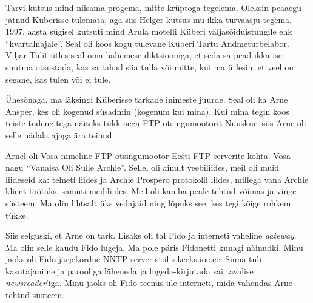 Tarvi kutsus mind niisama progema, mitte krüptoga tegelema. Oleksin peaaegu jätnud
Küberisse tulemata, aga siis Helger kutsus mu ikka turvaasju tegema. 1997. aasta sügisel
kutsuti mind Arula motelli Küberi väljasõiduistungile ehk \enquote{kvartalnajale}. Seal oli koos kogu tulevane
Küberi Tartu Andmeturbelabor. Viljar
Tulit ütles seal oma habemese diktsiooniga, et seda
sa pead ikka ise suutma otsustada, kas sa tahad siia tulla
või mitte, kui ma ütlesin, et veel on segane, kas tulen või ei tule.

Ühesõnaga, ma läksingi Küberisse tarkade inimeste juurde. Seal oli ka Arne
Ansper, kes oli kogenud süsadmin
(kogenum kui mina). Kui mina tegin koos teiste tudengitega näiteks tükk aega FTP otsingumootorit
Nuuskur, siis Arne oli selle
nädala ajaga ära teinud. 

Arnel oli Vosa-nimeline FTP
otsingumootor Eesti FTP-serverite kohta. Vosa nagu \enquote{Vanaisa Oli Sulle
Archie}. Sellel oli ainult veebiliides, meil oli
muid liideseid ka: telneti liides ja Archie Prospero
protokolli liides, millega
vana Archie klient töötaks, samuti meililiides. Meil oli kamba peale tehtud võimas ja vinge süsteem. Ma olin lihtsalt üks
vedajaid ning lõpuks see, kes tegi kõige rohkem tükke. 

Siis selguski, et
Arne on tark. Lisaks oli tal Fido ja
interneti vaheline \emph{gateway}. Ma olin selle kaudu
Fido lugeja. Ma pole päris Fidonetti kunagi
näinudki. Minu jaoks oli Fido järjekordne
NNTP server stiilis
keeks.ioc.ee. Sinna tuli kasutajanime ja parooliga
läheneda ja lugeda-kirjutada sai tavalise \emph{newsreader}'iga. Minu jaoks
oli Fido teenus üle interneti, mida vahendas Arne tehtud süsteem.

